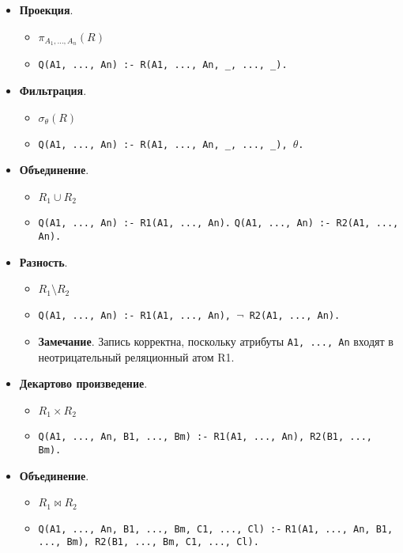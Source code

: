 \begin{itemize}
	\item \textbf{Проекция}.
	      \begin{itemize}
		      \item $\pi_{A_1, \ldots, A_n}(R)$
		      \item \texttt{Q(A1, ..., An) :- R(A1, ..., An, \_, ..., \_).}
	      \end{itemize}
	\item \textbf{Фильтрация}.
	      \begin{itemize}
		      \item $\sigma_{\theta}(R)$
		      \item \texttt{Q(A1, ..., An) :- R(A1, ..., An, \_, ..., \_), $\theta$.}
	      \end{itemize}
	\item \textbf{Объединение}.
	      \begin{itemize}
		      \item $R_1 \cup R_2$
		      \item \texttt{Q(A1, ..., An) :- R1(A1, ..., An).}
		            \linebreak \texttt{Q(A1, ..., An) :- R2(A1, ..., An).}
	      \end{itemize}
	\item \textbf{Разность}.
	      \begin{itemize}
		      \item $R_1 \setminus R_2$
		      \item \texttt{Q(A1, ..., An) :- R1(A1, ..., An), $\neg$ R2(A1, ..., An).}
		      \item \textbf{Замечание}. Запись корректна, поскольку атрибуты \texttt{A1, ..., An} входят
		            в неотрицательный реляционный атом R1.
	      \end{itemize}
	\item \textbf{Декартово произведение}.
	      \begin{itemize}
		      \item $R_1 \times R_2$
		      \item \texttt{Q(A1, ..., An, B1, ..., Bm) :- R1(A1, ..., An), R2(B1, ..., Bm).}
	      \end{itemize}
	\item \textbf{Объединение}.
	      \begin{itemize}
		      \item $R_1 \bowtie R_2$
		      \item \texttt{Q(A1, ..., An, B1, ..., Bm, C1, ..., Cl) :-}
		            \linebreak \texttt{R1(A1, ..., An, B1, ..., Bm), R2(B1, ..., Bm, C1, ..., Cl).}
	      \end{itemize}
\end{itemize}

